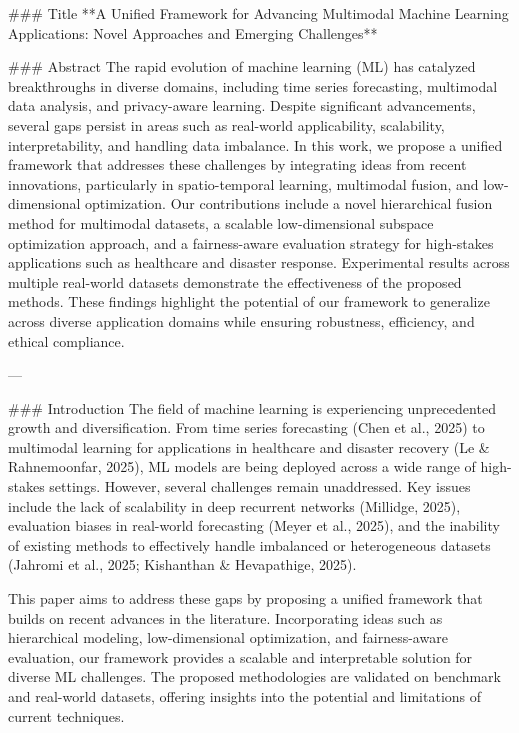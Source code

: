 ### Title
**A Unified Framework for Advancing Multimodal Machine Learning Applications: Novel Approaches and Emerging Challenges**

### Abstract
The rapid evolution of machine learning (ML) has catalyzed breakthroughs in diverse domains, including time series forecasting, multimodal data analysis, and privacy-aware learning. Despite significant advancements, several gaps persist in areas such as real-world applicability, scalability, interpretability, and handling data imbalance. In this work, we propose a unified framework that addresses these challenges by integrating ideas from recent innovations, particularly in spatio-temporal learning, multimodal fusion, and low-dimensional optimization. Our contributions include a novel hierarchical fusion method for multimodal datasets, a scalable low-dimensional subspace optimization approach, and a fairness-aware evaluation strategy for high-stakes applications such as healthcare and disaster response. Experimental results across multiple real-world datasets demonstrate the effectiveness of the proposed methods. These findings highlight the potential of our framework to generalize across diverse application domains while ensuring robustness, efficiency, and ethical compliance.

---

### Introduction
The field of machine learning is experiencing unprecedented growth and diversification. From time series forecasting (Chen et al., 2025) to multimodal learning for applications in healthcare and disaster recovery (Le & Rahnemoonfar, 2025), ML models are being deployed across a wide range of high-stakes settings. However, several challenges remain unaddressed. Key issues include the lack of scalability in deep recurrent networks (Millidge, 2025), evaluation biases in real-world forecasting (Meyer et al., 2025), and the inability of existing methods to effectively handle imbalanced or heterogeneous datasets (Jahromi et al., 2025; Kishanthan & Hevapathige, 2025). 

This paper aims to address these gaps by proposing a unified framework that builds on recent advances in the literature. Incorporating ideas such as hierarchical modeling, low-dimensional optimization, and fairness-aware evaluation, our framework provides a scalable and interpretable solution for diverse ML challenges. The proposed methodologies are validated on benchmark and real-world datasets, offering insights into the potential and limitations of current techniques.

